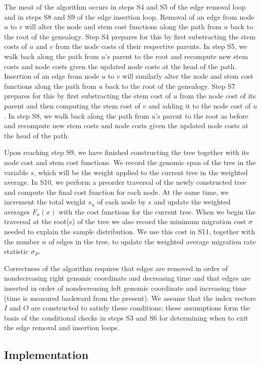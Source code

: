 The meat of the algorithm occurs in steps S4 and S5 of the edge removal loop
and in steps S8 and S9 of the edge insertion loop. Removal of an edge from
node $u$ to $v$ will alter the node and stem cost functions along the path from
$u$ back to the root of the genealogy. Step S4 prepares for this by first
substracting  the stem costs of $u$ and $v$ from the node costs of their
respective parents. In step S5, we walk back along the path from $u$'s parent to
the root and recompute new stem costs and node costs given the updated node
costs at the head of the path. Insertion of an edge from node $u$ to $v$ will 
similarly alter the node and stem cost functions along the path from
$u$ back to the root of the genealogy. Step S7 prepares for this by first
substracting the stem cost of $u$ from the node cost of its parent and then
computing the stem cost of $v$ and adding it to the node cost of $u$. In step 
S8, we walk back along the path from $u$'s parent to the root as before and 
recompute new stem costs and node costs given the updated node costs at the 
head of the path.

Upon reaching step S9, we have finished constructing the tree together with its
node cost and stem cost functions. We record the genomic span of the tree in the 
variable $s$, which will be the weight applied to the current tree in the weighted
average. In S10, we perform a preorder traversal of the newly constructed tree
and compute the final cost function for each node. At the same time, we 
increment the total weight $s_u$ of each node by $s$ and update the weighted 
averages $F_u(x)$ with the cost functions for the current tree. When we begin
the traversal at the root(s) of the tree we also record the minimum migration 
cost $\sigma$ needed to explain the sample distribution. We use this cost in
S11, together with the number $n$ of edges in the tree, to update the weighted
average migration rate statistic $\sigma_P$.

Correctness of the algorithm requires that edges are removed in order of 
nondecreasing right genomic coordinate and decreasing time and that edges are
inserted in order of nondecreasing left genomic coordinate and increasing time
(time is measured backward from the present). We assume that the index vectors
$I$ and $O$ are constructed to satisfy these conditions; these assumptions 
form the basis of the conditional checks in steps S3 and S6 for determining
when to exit the edge removal and insertion loops.

\subsection{Implementation}

